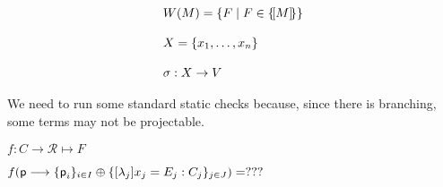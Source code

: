 \begin{displaymath}
  \begin{array}{lll}
    W(M) = \{F \mid F\in\{\![M]\!\}\}
    \\\\
    X = \{x_1,\ldots,x_n\}
    \\\\
    \sigma : X \rightarrow V
  \end{array}
\end{displaymath}



 We need to run some standard
static checks because, since there is branching, some terms may not be
projectable.


$f: C\rightarrow \mathcal R\mapsto F$

$f(\textsf{p}\longrightarrow\{\textsf{p}_i\}_{i\in I}\oplus\{[\lambda_j]
x_j=E_j: C_j\}_{j\in J}) =???$



